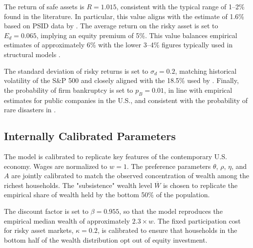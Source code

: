 \documentclass[12pt]{article}
\begin{document}
The return of safe assets is $R=1.015$, consistent with the typical range of 1–2\% found in the literature. In particular, this value aligns with the estimate of 1.6\% based on PSID data by \textcite{gourinchas2002}. The average return on the risky asset is set to $E_d = 0.065$, implying an equity premium of 5\%. This value balances empirical estimates of approximately 6\% with the lower 3–4\% figures typically used in structural models \parencite{mehra1985, bansal2004, barro2006}.

The standard deviation of risky returns is set to $\sigma_d = 0.2$, matching historical volatility of the S\&P 500 \parencite{ibbotson2018} and closely aligned with the 18.5\% used by \textcite{cochrane2005}. Finally, the probability of firm bankruptcy is set to $p_B = 0.01$, in line with empirical estimates for public companies in the U.S., and consistent with the probability of rare disasters in \textcite{barro2006}.

\subsection{Internally Calibrated Parameters}

The model is calibrated to replicate key features of the contemporary U.S. economy. Wages are normalized to $w = 1$. The preference parameters $\theta$, $\rho$, $\eta$, and $A$ are jointly calibrated to match the observed concentration of wealth among the richest households. The "subsistence" wealth level $\overline{W}$ is chosen to replicate the empirical share of wealth held by the bottom 50\% of the population.

The discount factor is set to $\beta = 0.955$, so that the model reproduces the empirical median wealth of approximately $2.3 \times w$. The fixed participation cost for risky asset markets, $\kappa = 0.2$, is calibrated to ensure that households in the bottom half of the wealth distribution opt out of equity investment.
\end{document}
